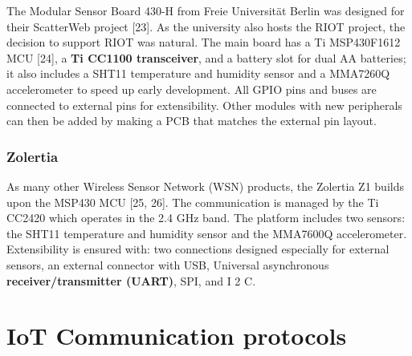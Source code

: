 The Modular Sensor Board 430-H from Freie Universität Berlin was designed for their ScatterWeb project [23].
As the university also hosts the RIOT project,
	the decision to support RIOT was natural.
The main board has a Ti MSP430F1612 MCU [24],
	a \textbf{Ti CC1100 transceiver},
	and a battery slot for dual AA batteries;
	it also includes a SHT11 temperature and humidity sensor and a MMA7260Q accelerometer to speed up early development.
All GPIO pins and buses are connected to external pins for extensibility.
Other modules with new peripherals can then be added by making a PCB that matches the external pin layout.

\subsubsection{Zolertia}

As many other Wireless Sensor Network (WSN) products,
	the Zolertia Z1 builds upon the MSP430 MCU [25, 26].
The communication is managed by the Ti CC2420 which operates in the 2.4 GHz band.
The platform includes two sensors:
	the SHT11 temperature and humidity sensor and the MMA7600Q accelerometer.
Extensibility is ensured with:
	two connections designed especially for external sensors,
	an external connector with USB,
	Universal asynchronous \textbf{receiver/transmitter (UART)},
	SPI,
	and I 2 C.


\section{IoT Communication protocols}


